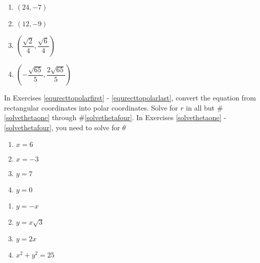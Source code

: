 \begin{multicols}{4} 

\begin{enumerate}

\setcounter{enumi}{\value{HW}}

\item  $\left(24, -7 \right)$ 
\item $\left(12, -9\right)$ 
\item $\left(\dfrac{\sqrt{2}}{4}, \dfrac{\sqrt{6}}{4}\right)$
\item  $\left(-\dfrac{\sqrt{65}}{5}, \dfrac{2\sqrt{65}}{5}\right)$ \label{recttopolarlast}

\setcounter{HW}{\value{enumi}}

\end{enumerate}

\end{multicols}

In Exercises \ref{equrecttopolarfirst} - \ref{equrecttopolarlast}, convert the equation from rectangular coordinates into polar coordinates.  Solve for $r$ in all but \#\ref{solvethetaone} through \#\ref{solvethetafour}.  In Exercises \ref{solvethetaone} - \ref{solvethetafour}, you need to solve for $\theta$

\begin{multicols}{4}

\begin{enumerate}

\setcounter{enumi}{\value{HW}}

\item $x = 6$ \label{equrecttopolarfirst}
\item $x = -3$
\item $y = 7$
\item $y = 0$ \label{solvethetaone} 

\setcounter{HW}{\value{enumi}}

\end{enumerate}

\end{multicols}

\begin{multicols}{4} 

\begin{enumerate}

\setcounter{enumi}{\value{HW}}

\item $y = -x$  
\item $y = x\sqrt{3}$  
\item $y = 2x$ \label{solvethetafour} 
\item $x^2 + y^2 = 25$

\setcounter{HW}{\value{enumi}}

\end{enumerate}

\end{multicols}

